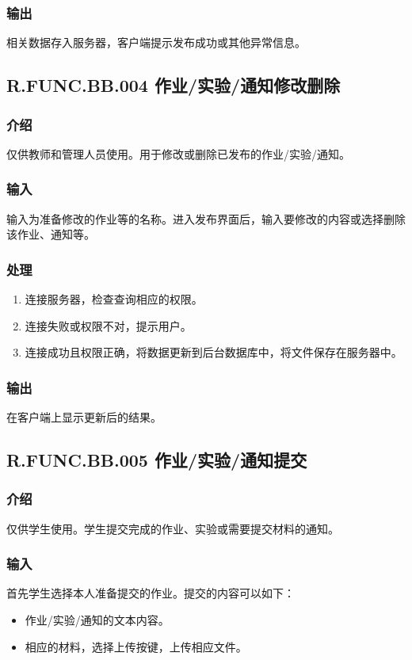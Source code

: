       \subsubsection{输出}
      相关数据存入服务器，客户端提示发布成功或其他异常信息。

    \subsection{R.FUNC.BB.004 作业/实验/通知修改删除}
      \subsubsection{介绍}
      仅供教师和管理人员使用。用于修改或删除已发布的作业/实验/通知。
      \subsubsection{输入}
      输入为准备修改的作业等的名称。进入发布界面后，输入要修改的内容或选择删除该作业、通知等。
      \subsubsection{处理}
      \begin{enumerate}
        \item 连接服务器，检查查询相应的权限。
        \item 连接失败或权限不对，提示用户。
        \item 连接成功且权限正确，将数据更新到后台数据库中，将文件保存在服务器中。
      \end{enumerate}
      \subsubsection{输出}
      在客户端上显示更新后的结果。

    \subsection{R.FUNC.BB.005 作业/实验/通知提交}
      \subsubsection{介绍}
      仅供学生使用。学生提交完成的作业、实验或需要提交材料的通知。
      \subsubsection{输入}
      首先学生选择本人准备提交的作业。提交的内容可以如下：
      \begin{itemize}
        \item 作业/实验/通知的文本内容。
        \item 相应的材料，选择上传按键，上传相应文件。
      \end{itemize}
